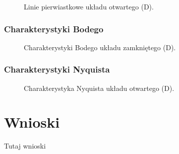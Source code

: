 \documentclass[12pt,a4paper]{article}
\begin{document}
	\begin{figure}[H]
		\centering
		\caption{Linie pierwiastkowe układu otwartego (D).}
		\label{fig:rlocus_D}
	\end{figure}
	
	
	\subsubsection{Charakterystyki Bodego}
	
	\begin{figure}[H]
		\centering
		\caption{Charakterystyki Bodego układu zamkniętego (D).}
		\label{fig:bode_D}
	\end{figure}
	
	
	\subsubsection{Charakterystyki Nyquista}
	
	\begin{figure}[H]
		\centering
		\caption{Charakterystyka Nyquista układu otwartego (D).}
		\label{fig:nyquist_D}
	\end{figure}
	
	
	\section{Wnioski}
	Tutaj wnioski
	
\end{document}
